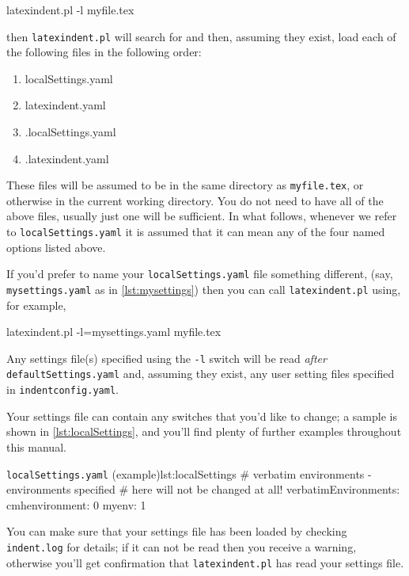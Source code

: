  \begin{commandshell}
latexindent.pl -l myfile.tex
\end{commandshell}

 then \texttt{latexindent.pl} will search for and then, assuming they exist, load each of
 the following files in the following order:
 \begin{enumerate}
  \item localSettings.yaml
  \item latexindent.yaml
  \item .localSettings.yaml
  \item .latexindent.yaml
 \end{enumerate}
 These files will be assumed to be in the same directory as \texttt{myfile.tex}, or
 otherwise in the current working directory. You do not need to have all of the above
 files, usually just one will be sufficient. In what follows, whenever we refer to
 \texttt{localSettings.yaml} it is assumed that it can mean any of the four named options
 listed above.

 If you'd prefer to name your \texttt{localSettings.yaml} file something different, (say,
 \texttt{mysettings.yaml} as in \cref{lst:mysettings}) then you can call
 \texttt{latexindent.pl} using, for example,

 \begin{commandshell}
latexindent.pl -l=mysettings.yaml myfile.tex
\end{commandshell}

 Any settings file(s) specified using the \texttt{-l} switch will be read \emph{after}
 \texttt{defaultSettings.yaml} and, assuming they exist, any user setting files specified
 in \texttt{indentconfig.yaml}.

 Your settings file can contain any switches that you'd like to change; a sample is shown
 in \cref{lst:localSettings}, and you'll find plenty of further examples throughout this
 manual. 

 \begin{yaml}{\texttt{localSettings.yaml} (example)}{lst:localSettings}
#  verbatim environments - environments specified
#  here will not be changed at all!
verbatimEnvironments:
    cmhenvironment: 0
    myenv: 1
\end{yaml}

 You can make sure that your settings file has been loaded by checking
 \texttt{indent.log} for details; if it can not be read then you receive a warning,
 otherwise you'll get confirmation that \texttt{latexindent.pl} has read your settings
 file.

